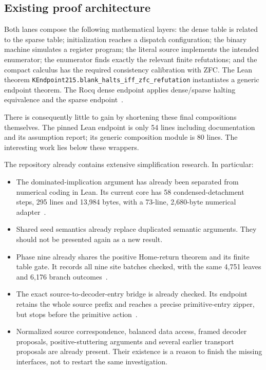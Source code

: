 \documentclass[11pt]{article}
\newcommand{\code}[1]{\texttt{\small #1}}
\begin{document}
\subsection{Existing proof architecture}

Both lanes compose the following mathematical layers: the dense table is related to the sparse table; initialization reaches a dispatch configuration; the binary machine simulates a register program; the literal source implements the intended enumerator; the enumerator finds exactly the relevant finite refutations; and the compact calculus has the required consistency calibration with ZFC. The Lean theorem \code{KEndpoint215.blank\_halts\_iff\_zfc\_refutation} instantiates a generic endpoint theorem. The Rocq dense endpoint applies dense/sparse halting equivalence and the sparse endpoint~\cite{endpoint,rocqendpoint}.

There is consequently little to gain by shortening these final compositions themselves. The pinned Lean endpoint is only 54 lines including documentation and its assumption report; its generic composition module is 80 lines. The interesting work lies below these wrappers.

The repository already contains extensive simplification research. In particular:
\begin{itemize}
\item The dominated-implication argument has already been separated from numerical coding in Lean. Its current core has 58 condensed-detachment steps, 295 lines and 13,984 bytes, with a 73-line, 2,680-byte numerical adapter~\cite{core,adapter,cd}.
\item Shared seed semantics already replace duplicated semantic arguments. They should not be presented again as a new result.
\item Phase nine already shares the positive Home-return theorem and its finite table gate. It records all nine site batches checked, with the same 4,751 leaves and 6,176 branch outcomes~\cite{phase9}.
\item The exact source-to-decoder-entry bridge is already checked. Its endpoint retains the whole source prefix and reaches a precise primitive-entry zipper, but stops before the primitive action~\cite{decoder}.
\item Normalized source correspondence, balanced data access, framed decoder proposals, positive-stuttering arguments and several earlier transport proposals are already present. Their existence is a reason to finish the missing interfaces, not to restart the same investigation.
\end{itemize}
\end{document}
